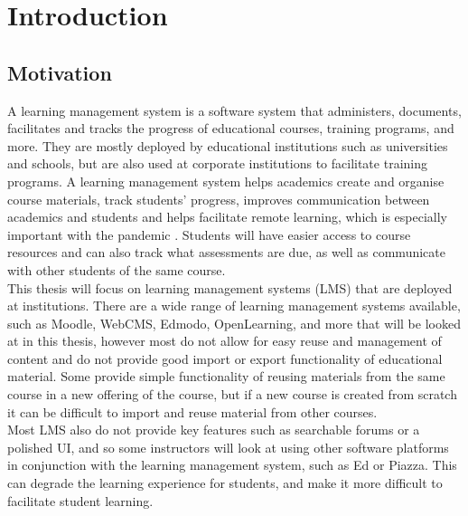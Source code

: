 \chapter{Introduction}\label{ch:intro}

\section{Motivation}
A learning management system is a software system that administers, documents, facilitates and tracks the progress of educational courses, training programs, and more. They are mostly deployed by educational institutions such as universities and schools, but are also used at corporate institutions to facilitate training programs\cite{lmsdefinition}. A learning management system helps academics create and organise course materials, track students' progress, improves communication between academics and students and helps facilitate remote learning, which is especially important with the pandemic \cite{lmsreasons}. Students will have easier access to course resources and can also track what assessments are due, as well as communicate with other students of the same course.\\

This thesis will focus on learning management systems (LMS) that are deployed at institutions. There are a wide range of learning management systems available, such as Moodle, WebCMS, Edmodo, OpenLearning, and more that will be looked at in this thesis, however most do not allow for easy reuse and management of content and do not provide good import or export functionality of educational material. Some provide simple functionality of reusing materials from the same course in a new offering of the course, but if a new course is created from scratch it can be difficult to import and reuse material from other courses.\\

Most LMS also do not provide key features such as searchable forums or a polished UI, and so some instructors will look at using other software platforms in conjunction with the learning management system, such as Ed or Piazza. This can degrade the learning experience for students, and make it more difficult to facilitate student learning.\\

